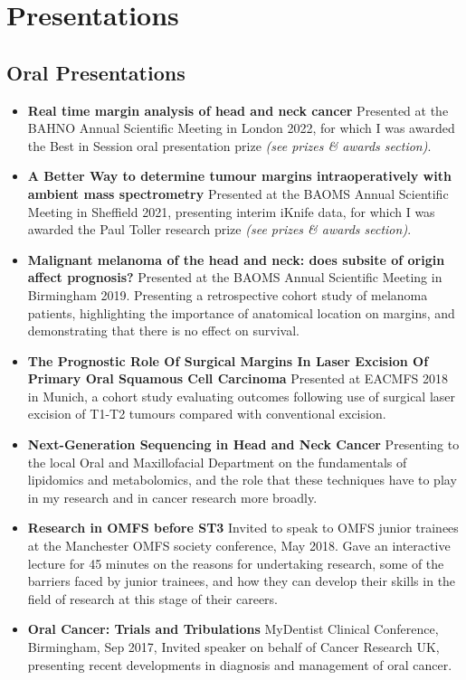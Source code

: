 \section*{Presentations}
\subsection*{Oral Presentations}
\begin{itemize}
	\item\textbf{Real time margin analysis of head and neck cancer} Presented at the BAHNO Annual Scientific Meeting in London 2022, for which I was awarded the Best in Session oral presentation prize \textit{(see prizes \& awards section)}.
	\item\textbf{A Better Way to determine tumour margins intraoperatively with ambient mass spectrometry} Presented at the BAOMS Annual Scientific Meeting in Sheffield 2021, presenting interim iKnife data, for which I was awarded the Paul Toller research prize \textit{(see prizes \& awards section)}.
	\item\textbf{Malignant melanoma of the head and neck: does subsite of origin affect prognosis?} Presented at the BAOMS Annual Scientific Meeting in Birmingham 2019. Presenting a retrospective cohort study of melanoma patients, highlighting the importance of anatomical location on margins, and demonstrating that there is no effect on survival.
        \item\textbf{The Prognostic Role Of Surgical Margins In Laser Excision Of Primary Oral Squamous Cell Carcinoma} Presented at EACMFS 2018 in Munich, a cohort study evaluating outcomes following use of surgical laser excision of T1-T2 tumours compared with conventional excision.
        \item\textbf{Next-Generation Sequencing in Head and Neck Cancer} Presenting to the local Oral and Maxillofacial Department on the fundamentals of lipidomics and metabolomics, and the role that these techniques have to play in my research and in cancer research more broadly.
        \item\textbf{Research in OMFS before ST3} Invited to speak to OMFS junior trainees at the Manchester OMFS society conference, May 2018. Gave an interactive lecture for 45 minutes on the reasons for undertaking research, some of the barriers faced by junior trainees, and how they can develop their skills in the field of research at this stage of their careers.
        \item\textbf{Oral Cancer: Trials and Tribulations} MyDentist Clinical Conference, Birmingham, Sep 2017, Invited speaker on behalf of Cancer Research UK, presenting recent developments in diagnosis and management of oral cancer.

\end{itemize}
